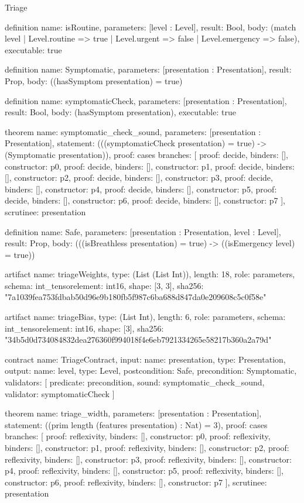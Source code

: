 \begin{lexlean}{Triage}
\begin{semanticmodule}
definition{
  name: isRoutine,
  parameters: [level : Level],
  result: Bool,
  body: (match level | Level.routine => true | Level.urgent => false | Level.emergency => false),
  executable: true
}

definition{
  name: Symptomatic,
  parameters: [presentation : Presentation],
  result: Prop,
  body: ((hasSymptom presentation) = true)
}

definition{
  name: symptomaticCheck,
  parameters: [presentation : Presentation],
  result: Bool,
  body: (hasSymptom presentation),
  executable: true
}

theorem{
  name: symptomatic_check_sound,
  parameters: [presentation : Presentation],
  statement: (((symptomaticCheck presentation) = true) -> (Symptomatic presentation)),
  proof: cases{
    branches: [
      {proof: decide{}, binders: [], constructor: p0},
      {proof: decide{}, binders: [], constructor: p1},
      {proof: decide{}, binders: [], constructor: p2},
      {proof: decide{}, binders: [], constructor: p3},
      {proof: decide{}, binders: [], constructor: p4},
      {proof: decide{}, binders: [], constructor: p5},
      {proof: decide{}, binders: [], constructor: p6},
      {proof: decide{}, binders: [], constructor: p7}
    ],
    scrutinee: presentation
  }
}

definition{
  name: Safe,
  parameters: [presentation : Presentation, level : Level],
  result: Prop,
  body: (((isBreathless presentation) = true) -> ((isEmergency level) = true))
}

artifact{
  name: triageWeights,
  type: (List (List Int)),
  length: 18,
  role: parameters,
  schema: int_tensor{element: int16, shape: [3, 3]},
  sha256: "7a1039fea753fdbab50d96e9b180fb5f987c6ba688d847da0e209608c5c0f58e"
}

artifact{
  name: triageBias,
  type: (List Int),
  length: 6,
  role: parameters,
  schema: int_tensor{element: int16, shape: [3]},
  sha256: "34b5d0d734084832dea276360f994018f4e6eb7921334265e58217b360a2a79d"
}

contract{
  name: TriageContract,
  input: {name: presentation, type: Presentation},
  output: {name: level, type: Level},
  postcondition: Safe,
  precondition: Symptomatic,
  validators: [
    {predicate: precondition, sound: symptomatic_check_sound, validator: symptomaticCheck}
  ]
}

theorem{
  name: triage_width,
  parameters: [presentation : Presentation],
  statement: ((prim length (features presentation) : Nat) = 3),
  proof: cases{
    branches: [
      {proof: reflexivity{}, binders: [], constructor: p0},
      {proof: reflexivity{}, binders: [], constructor: p1},
      {proof: reflexivity{}, binders: [], constructor: p2},
      {proof: reflexivity{}, binders: [], constructor: p3},
      {proof: reflexivity{}, binders: [], constructor: p4},
      {proof: reflexivity{}, binders: [], constructor: p5},
      {proof: reflexivity{}, binders: [], constructor: p6},
      {proof: reflexivity{}, binders: [], constructor: p7}
    ],
    scrutinee: presentation
  }
}


\end{semanticmodule}
\end{lexlean}
